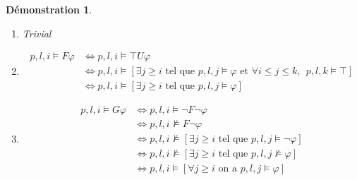 \documentclass[12pt,a4paper]{article}
\theoremstyle{plain}
\newtheorem{dem}{Démonstration}
\theoremstyle{definition}
\begin{document}
\begin{dem}
	\leavevmode
	\begin{enumerate}
		\item Trivial
		\item 
		\begin{align*}
			p,l,i \models F\varphi &\Leftrightarrow p,l,i \models \top U \varphi \\
			&\Leftrightarrow p,l,i \models [\exists j \geq i \textrm{ tel que } p,l,j \models \varphi \textrm{ et } \forall i \leq j \leq k, \:\: p,l,k\models \top] \\
			&\Leftrightarrow p,l,i \models [\exists j \geq i \text{ tel que } p,l,j \models \varphi]
		\end{align*}
		\item 
		\begin{align*}
			p,l,i \models G \varphi &\Leftrightarrow p,l,i \models \lnot F \lnot \varphi \\
			&\Leftrightarrow p,l,i \not \models F \lnot \varphi \\
			&\Leftrightarrow p,l,i \not \models [\exists j \geq i \textrm{ tel que } p,l,j \models \lnot \varphi] \\
			&\Leftrightarrow p,l,i \not \models [\exists j \geq i \textrm{ tel que } p,l,j \not \models \varphi] \\
			&\Leftrightarrow p,l,i \models [\forall j \geq i \textrm{ on a } p,l,j \models \varphi]
		\end{align*}
	\end{enumerate}
\end{dem}
\end{document}
